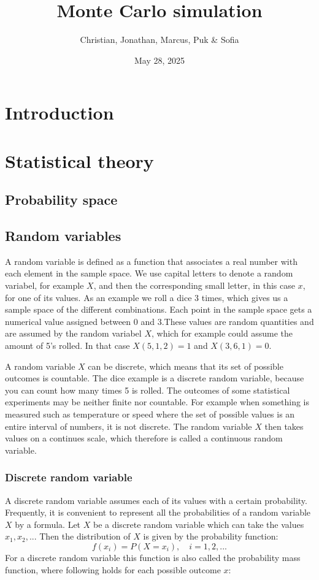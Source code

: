 \documentclass{article}
\title{Monte Carlo simulation}
\author{Christian, Jonathan, Marcus, Puk \& Sofia }
\date{May 28, 2025}
\begin{document}
	\maketitle
	\newpage
	\tableofcontents
	\newpage
	\section{Introduction}
	\newpage
	\section{Statistical theory}
	\subsection{Probability space}
	\subsection{Random variables}
	
	A random variable is defined as a function that associates a real number with each element in the sample space. We use capital letters to denote a random variabel, for example $X$, and then the corresponding small letter, in this case $x$, for one of its values. As an example we roll a dice 3 times, which gives us a sample space of the different combinations. Each point in the sample space gets a numerical value assigned between 0 and 3.These values are random quantities and are assumed by the random variabel $X$, which for example could assume the amount of 5's rolled. In that case $X(5,1,2) = 1$ and $X(3,6,1) = 0$.
	\newline
	
	 A random variable $X$ can be discrete, which means that its set of possible outcomes is countable. The dice example is a discrete random variable, because you can count how many times 5 is rolled. The outcomes of some statistical experiments may be neither finite nor countable. For example when something is measured such as temperature or speed where the set of possible values is an entire interval of numbers, it is not discrete. The random variable $X$ then takes values on a continues scale, which therefore is called a continuous random variable.
	
	\subsubsection{Discrete random variable}
	A discrete random variable assumes each of its values with a certain probability. Frequently, it is convenient to represent all the probabilities of a random variable $X$ by a formula. Let $X$ be a discrete random variable which can take the values $x_{1}, x_{2},...$ Then the distribution of $X$ is given by the probability function:
	$$f(x_{i})=P(X=x_{i}),\quad i=1,2,...$$
	\newline
	For a discrete random variable this function is also called the probability mass function, where following holds for each possible outcome $x$:
	
\end{document}
